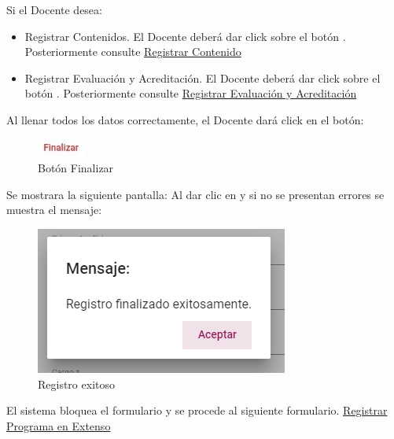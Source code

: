Si el Docente desea:

\begin{itemize}
    \item Registrar Contenidos. El Docente deberá dar click sobre el botón . Posteriormente consulte \hyperlink{Registrar Contenido}{Registrar Contenido}
    \item Registrar Evaluación y Acreditación. El Docente deberá dar click sobre el botón . Posteriormente consulte \hyperlink{REyA}{Registrar Evaluación y Acreditación}
\end{itemize}

Al llenar todos los datos correctamente, el Docente dará click en el botón:

\begin{figure}[H]
    \centering
    \includegraphics[width=0.1\linewidth]{images/SP6/BotonFinalizar.jpeg}
    \caption{Botón Finalizar}
\end{figure}

Se mostrara la siguiente pantalla:
Al dar clic en  y si no se presentan errores se muestra el mensaje:


\begin{figure}[H]
    \centering
    \includegraphics[width=0.4\linewidth]{images/SP6/MSG5.png}
    \caption{Registro exitoso}
    \label{mensaje5}
\end{figure}


El sistema bloquea el formulario y se procede al siguiente formulario. \hyperlink{RPE}{Registrar Programa en Extenso}


